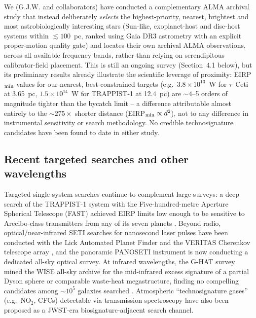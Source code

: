 \documentclass[10pt,twocolumn]{article}
\begin{document}
We (G.J.W. and collaborators) have conducted a complementary ALMA archival study that instead deliberately \emph{selects} the highest-priority, nearest, brightest and most astrobiologically interesting stars (Sun-like, exoplanet-host and disc-host systems within $\lesssim100$~pc, ranked using Gaia DR3 astrometry with an explicit proper-motion quality gate) and locates their own archival ALMA observations, across all available frequency bands, rather than relying on serendipitous calibrator-field placement. This is still an ongoing survey (Section~4.1 below), but its preliminary results already illustrate the scientific leverage of proximity: EIRP$_{\rm min}$ values for our nearest, best-constrained targets (e.g.\ $3.8\times10^{13}$~W for $\tau$~Ceti at 3.65~pc, $1.5\times10^{14}$~W for TRAPPIST-1 at 12.4~pc) are $\sim4$--5 orders of magnitude tighter than the \citet{mason2024} bycatch limit -- a difference attributable almost entirely to the $\sim275\times$ shorter distance (EIRP$_{\rm min}\propto d^2$), not to any difference in instrumental sensitivity or search methodology. No credible technosignature candidates have been found to date in either study.

\subsection{Recent targeted searches and other wavelengths}
Targeted single-system searches continue to complement large surveys: a deep search of the TRAPPIST-1 system with the Five-hundred-metre Aperture Spherical Telescope (FAST) achieved EIRP limits low enough to be sensitive to Arecibo-class transmitters from any of its seven planets \citep{fast2025}. Beyond radio, optical/near-infrared SETI searches for nanosecond laser pulses have been conducted with the Lick Automated Planet Finder and the VERITAS Cherenkov telescope array \citep{veritas}, and the panoramic PANOSETI instrument is now conducting a dedicated all-sky optical survey. At infrared wavelengths, the G-HAT survey mined the WISE all-sky archive for the mid-infrared excess signature of a partial Dyson sphere or comparable waste-heat megastructure, finding no compelling candidates among $\sim10^5$ galaxies searched \citep{wright2014,griffith2015}. Atmospheric ``technosignature gases'' (e.g.\ NO$_2$, CFCs) detectable via transmission spectroscopy have also been proposed as a JWST-era biosignature-adjacent search channel.
\end{document}
